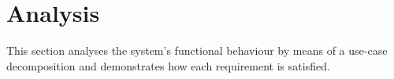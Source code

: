 \section{Analysis}

This section analyses the system's functional behaviour by means of a use-case decomposition and demonstrates how each requirement is satisfied.



